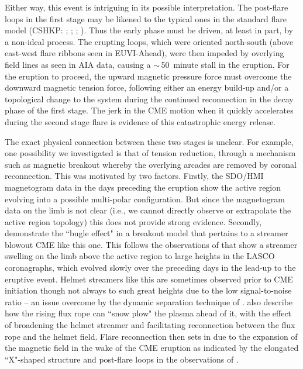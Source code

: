 \documentclass[namedreferences]{solarphysics}
\begin{document}
\begin{article}
{%

Either way, this event is intriguing in its possible interpretation. The post-flare loops in the first stage may be likened to the typical ones in the standard flare model (CSHKP: ; ; ; ). Thus the early phase must be driven, at least in part, by a non-ideal process. The erupting loops, which were oriented north-south (above east-west flare ribbons seen in EUVI-Ahead), were then impeded by overlying field lines as seen in AIA data, causing a $\sim$\,50~minute stall in the eruption. For the eruption to proceed, the upward magnetic pressure force must overcome the downward magnetic tension force, following either an energy build-up and/or a topological change to the system during the continued reconnection in the decay phase of the first stage. The jerk in the CME motion when it quickly accelerates during the second stage flare is evidence of this catastrophic energy release.

The exact physical connection between these two stages is unclear. For example, one possibility we investigated is that of tension reduction, through a mechanism such as magnetic breakout whereby the overlying arcades are removed by coronal reconnection. This was motivated by two factors. Firstly, the SDO/HMI magnetogram data in the days preceding the eruption show the active region evolving into a possible multi-polar configuration. But since the magnetogram data on the limb is not clear (i.e., we cannot directly observe or extrapolate the active region topology) this does not provide strong evidence. Secondly,  demonstrate the ``bugle effect" in a breakout model that pertains to a streamer blowout CME like this one. This follows the observations of  that show a streamer swelling on the limb above the active region to large heights in the LASCO coronagraphs, which evolved slowly over the preceding days in the lead-up to the eruptive event. Helmet streamers like this are sometimes observed prior to CME initiation \cite{1993JGR....9813177H} though not always to such great heights due to the low signal-to-noise ratio -- an issue overcome by the dynamic separation technique of .  also describe how the rising flux rope can ``snow plow" the plasma ahead of it, with the effect of broadening the helmet streamer and facilitating reconnection between the flux rope and the helmet field. Flare reconnection then sets in due to the expansion of the magnetic field in the wake of the CME eruption as indicated by the elongated ``X"-shaped structure and post-flare loops in the observations of .

}
\end{article}
\end{document}
